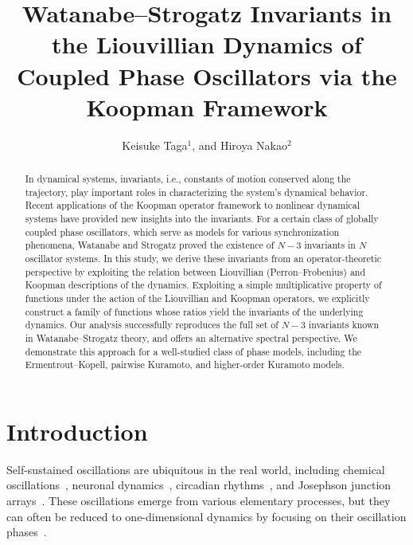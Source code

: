 \documentclass[
amsmath,amssymb,
]{revtex4-2}
\begin{document}
\title{Watanabe--Strogatz Invariants in the Liouvillian Dynamics of Coupled Phase Oscillators via the Koopman Framework}
%

\author{Keisuke Taga$^{1}$, and Hiroya Nakao$^{2}$}

\address{$^{1}$Department of Physics and Astronomy, Tokyo University of Science, Chiba 278-8510, Japan\\
$^{2}$Department of Systems and Control Engineering and Research Center for Autonomous Systems Materialogy, Institute of Science Tokyo, Tokyo 152-8552, Japan}



\begin{abstract}
%
In dynamical systems, invariants, i.e., constants of motion conserved along the trajectory, play important roles in characterizing the system's dynamical behavior. Recent applications of the Koopman operator framework to nonlinear dynamical systems have provided new insights into the invariants. For a certain class of globally coupled phase oscillators, which serve as models for various synchronization phenomena, Watanabe and Strogatz proved the existence of $N-3$ invariants in $N$ oscillator systems.
In this study, we derive these invariants
from an operator-theoretic perspective by exploiting the relation between 
Liouvillian (Perron--Frobenius) and Koopman descriptions of the dynamics.
%
Exploiting a simple multiplicative property of functions under the action of the Liouvillian and Koopman operators, we explicitly construct a family of functions whose ratios yield the invariants of the underlying dynamics.
%
Our analysis successfully reproduces the full set of $N-3$ invariants known in Watanabe--Strogatz theory, and offers an alternative spectral perspective.
We demonstrate this approach for a well-studied class of phase models, including the Ermentrout--Kopell, pairwise Kuramoto, and higher-order Kuramoto models. 
\end{abstract}

\maketitle

\section{Introduction}

Self-sustained oscillations are ubiquitous in the real world,
including chemical oscillations~\cite{prigogine1968symmetry,Kuramoto1984chemical,winfree1967phase}, neuronal dynamics~\cite{fitzhugh1955threshold,nagumo1962pulse,ermentrout1986parabolic}, 
circadian rhythms~\cite{Goldbeter1995circadian,kori2017jetlag}, and
Josephson junction arrays~\cite{Watanabe1994constants}.
%
These oscillations emerge from various elementary processes, but they can often be 
reduced to one-dimensional dynamics by focusing on their oscillation phases~\cite{winfree1967phase,Kuramoto1984chemical,sakaguchi1986soluble,daido1992order,mauroy2013isostables,nakao2016phase,shirasaka2017phase,yawata2024autoencoder,namura2026arbitrary,ozawa2026delay}. 
 
\end{document}
